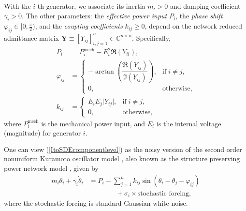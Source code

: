 \documentclass[10pt,twocolumn]{IEEEtran}
\begin{document}
With the $i$-th generator, we associate its inertia $m_{i}>0$ and damping coefficient $\gamma_{i}>0$. The other parameters: the \emph{effective power input} $P_{i}$, the \emph{phase shift} $\varphi_{ij}\in[0,\frac{\pi}{2})$, and the \emph{coupling coefficients} $k_{ij}\geq 0$, depend on the network reduced admittance matrix $\bm{Y}\equiv[Y_{ij}]_{i,j=1}^{n}\in\mathbb{C}^{n\times n}$. Specifically,
\begin{subequations}
\begin{align}
 P_{i} &= P_{i}^{\text{mech}} - E_{i}^{2} \Re\left(Y_{ii}\right), \\
 \varphi_{ij} &= \begin{cases} -\arctan\left(\dfrac{\Re\left(Y_{ij}\right)}{\Im\left(Y_{ij}\right)}\right), & \text{if}\;i\neq j,\\
 0, & \text{otherwise},
 \end{cases}\\
 k_{ij} &= \begin{cases} E_{i}E_{j} \vert Y_{ij}\vert, & \text{if}\;i\neq j,\\
 0, & \text{otherwise},
 \end{cases}
\end{align}
\end{subequations}
where $P_{i}^{\text{mech}}$ is the mechanical power input, and $E_{i}$ is the internal voltage (magnitude) for generator $i$.


One can view (\ref{ItoSDEcomponentlevel}) as the noisy version of the second order nonuniform Kuramoto oscillator model \cite{dorfler2012synchronization,rodrigues2016kuramoto}, also known as the structure preserving power network model \cite{odun2012structure}, given by
\begin{align}
m_{i}\ddot{\theta}_{i} + \gamma_{i}\dot{\theta}_{i} &= P_{i} - \displaystyle\sum_{j=1}^{n} k_{ij}\sin\left(\theta_{i} - \theta_{j} - \varphi_{ij}\right) \nonumber\\
&\qquad\qquad+ \sigma_{i} \times \text{stochastic forcing},
\label{LangevinForm}	
\end{align}
where the stochastic forcing is standard Gaussian white noise. 
\end{document}
